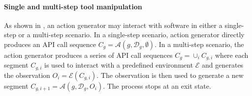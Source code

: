 \paragraph{Single and multi-step tool manipulation}
As shown in , an action generator may interact with software in either a single-step or a multi-step scenario. 
In a single-step scenario, action generator directly produces an API call sequence $C_g=\mathcal{A}\left(g, \mathcal{D}_g, \emptyset\right)$. 
In a multi-step scenario, the action generator produces a series of API call sequences $C_g = \cup_i C_{g, i}$ where each segment $C_{g, i}$ is used to interact with a predefined environment $\mathcal{E}$ and generates the observation $O_i = \mathcal{E}(C_{g, i})$. The observation is then used to generate a new segment $C_{g, i+1} = \mathcal{A}\left(g, \mathcal{D}_g, O_i\right)$. The process stops at an exit state. 
